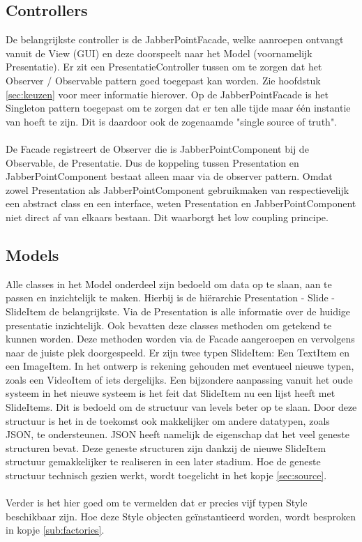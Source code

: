 \documentclass[a4paper]{article}
\newcommand{\1}[0]{\'{e}\'{e}n}
\begin{document}
\subsection{Controllers}
De belangrijkste controller is de JabberPointFacade, welke aanroepen ontvangt vanuit de View (GUI) en deze doorspeelt naar het Model (voornamelijk Presentatie). Er zit een PresentatieController tussen om te zorgen dat het Observer / Observable pattern goed toegepast kan worden. Zie hoofdstuk \ref{sec:keuzen} voor meer informatie hierover. Op de JabberPointFacade is het Singleton pattern toegepast om te zorgen dat er ten alle tijde maar \1 instantie van hoeft te zijn. Dit is daardoor ook de zogenaamde "single source of truth".
\\\\
De Facade registreert de Observer die is JabberPointComponent bij de Observable, de Presentatie. Dus de koppeling tussen Presentation en JabberPointComponent bestaat alleen maar via de observer pattern. Omdat zowel Presentation als JabberPointComponent gebruikmaken van respectievelijk een abstract class en een interface, weten Presentation en JabberPointComponent niet direct af van elkaars bestaan. Dit waarborgt het low coupling principe.

\subsection{Models}
Alle classes in het Model onderdeel zijn bedoeld om data op te slaan, aan te passen en inzichtelijk te maken. Hierbij is de hi\"{e}rarchie Presentation - Slide - SlideItem de belangrijkste. Via de Presentation is alle informatie over de huidige presentatie inzichtelijk. Ook bevatten deze classes methoden om getekend te kunnen worden. Deze methoden worden via de Facade aangeroepen en vervolgens naar de juiste plek doorgespeeld. Er zijn twee typen SlideItem: Een TextItem en een ImageItem. In het ontwerp is rekening gehouden met eventueel nieuwe typen, zoals een VideoItem of iets dergelijks. Een bijzondere aanpassing vanuit het oude systeem in het nieuwe systeem is het feit dat SlideItem nu een lijst heeft met SlideItems. Dit is bedoeld om de structuur van levels beter op te slaan. Door deze structuur is het in de toekomst ook makkelijker om andere datatypen, zoals JSON, te ondersteunen. JSON heeft namelijk de eigenschap dat het veel geneste structuren bevat. Deze geneste structuren zijn dankzij de nieuwe SlideItem structuur gemakkelijker te realiseren in een later stadium. Hoe de geneste structuur technisch gezien werkt, wordt toegelicht in het kopje \ref{sec:source}.
\\\\
Verder is het hier goed om te vermelden dat er precies vijf typen Style beschikbaar zijn. Hoe deze Style objecten ge\"{i}nstantieerd worden, wordt besproken in kopje \ref{sub:factories}.
\end{document}

